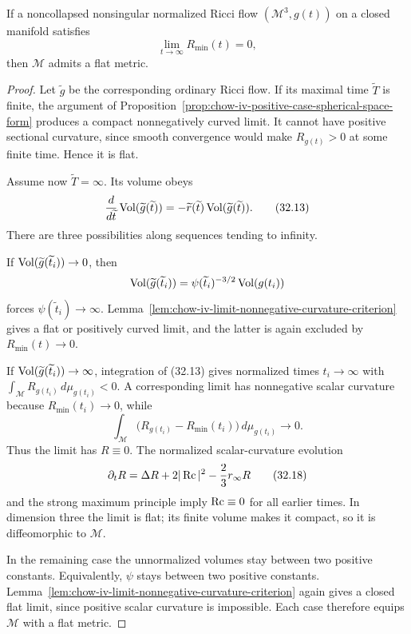 \begin{proposition}
\label{prop:chow-iv-zero-case-flat-metric}


If a noncollapsed nonsingular normalized Ricci flow
$(\mathcal M^3,g(t))$ on a closed manifold satisfies
\[
 \lim_{t\to\infty}R_{\min}(t)=0,
\]
then $\mathcal M$ admits a flat metric.
\end{proposition}
\begin{proof}
\sketch
Let $\widetilde g$ be the corresponding ordinary Ricci flow.  If its
maximal time $\widetilde T$ is finite, the argument of
Proposition~\ref{prop:chow-iv-positive-case-spherical-space-form} produces a
compact nonnegatively curved limit.  It cannot have positive sectional
curvature, since smooth convergence would make $R_{g(t)}>0$ at some finite
time.  Hence it is flat.

Assume now $\widetilde T=\infty$.  Its volume obeys
\begin{equation*}
 \frac d{d\widetilde t}\operatorname{Vol}(\widetilde g(\widetilde t))
 =-\widetilde r(\widetilde t)\operatorname{Vol}(\widetilde g(\widetilde t)).
 \tag{32.13}
\end{equation*}
There are three possibilities along sequences tending to infinity.

If $\operatorname{Vol}(\widetilde g(\widetilde t_i))\to0$, then
\[
 \operatorname{Vol}(\widetilde g(\widetilde t_i))
 =\psi(\widetilde t_i)^{-3/2}\operatorname{Vol}(g(t_i))
\]
forces $\psi(\widetilde t_i)\to\infty$.  Lemma~\ref{lem:chow-iv-limit-nonnegative-curvature-criterion}
gives a flat or positively curved limit, and the latter is again excluded by
$R_{\min}(t)\to0$.

If $\operatorname{Vol}(\widetilde g(\widetilde t_i))\to\infty$, integration of (32.13)
gives normalized times $t_i\to\infty$ with
$\int_{\mathcal M}R_{g(t_i)}\,d\mu_{g(t_i)}<0$.  A corresponding limit has
nonnegative scalar curvature because $R_{\min}(t_i)\to0$, while
\[
 \int_{\mathcal M}
 \bigl(R_{g(t_i)}-R_{\min}(t_i)\bigr)\,d\mu_{g(t_i)}\longrightarrow0.
\]
Thus the limit has $R\equiv0$.  The normalized scalar-curvature evolution
\[
 \partial_tR=\Delta R+2|\operatorname{Rc}|^2-\frac23r_\infty R
 \tag{32.18}
\]
and the strong maximum principle imply $\operatorname{Rc}\equiv0$ for all earlier times.
In dimension three the limit is flat; its finite volume makes it compact,
so it is diffeomorphic to $\mathcal M$.

In the remaining case the unnormalized volumes stay between two positive
constants.  Equivalently, $\psi$ stays between two positive constants.
Lemma~\ref{lem:chow-iv-limit-nonnegative-curvature-criterion} again gives a
closed flat limit, since positive scalar curvature is impossible.  Each
case therefore equips $\mathcal M$ with a flat metric.
\end{proof}

